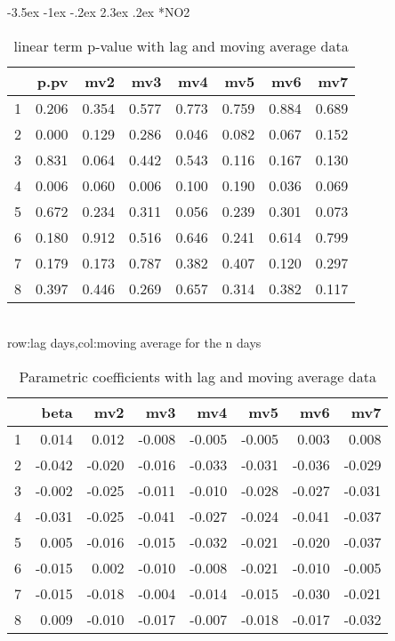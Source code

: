 \documentclass[a4paper, 12pt]{article}
\makeatletter
\def\large{\fontsize{14}{20}\selectfont}
\renewcommand\subsection{\@startsection {subsection}{1}{\z@}%
                                   {-3.5ex \@plus -1ex \@minus -.2ex}%
                                   {2.3ex \@plus.2ex}%
                                   {\centering\normalfont\large\bfseries}}
\makeatother
\begin{document}
\subsection*{NO2}
\begin{table}[h]
\centering
\caption{linear term p-value with lag and moving average data}
\begin{tabular}{rrrrrrrr}
  \hline
 & p.pv & mv2 & mv3 & mv4 & mv5 & mv6 & mv7 \\
  \hline
1 & 0.206 & 0.354 & 0.577 & 0.773 & 0.759 & 0.884 & 0.689 \\
  2 & 0.000 & 0.129 & 0.286 & 0.046 & 0.082 & 0.067 & 0.152 \\
  3 & 0.831 & 0.064 & 0.442 & 0.543 & 0.116 & 0.167 & 0.130 \\
  4 & 0.006 & 0.060 & 0.006 & 0.100 & 0.190 & 0.036 & 0.069 \\
  5 & 0.672 & 0.234 & 0.311 & 0.056 & 0.239 & 0.301 & 0.073 \\
  6 & 0.180 & 0.912 & 0.516 & 0.646 & 0.241 & 0.614 & 0.799 \\
  7 & 0.179 & 0.173 & 0.787 & 0.382 & 0.407 & 0.120 & 0.297 \\
  8 & 0.397 & 0.446 & 0.269 & 0.657 & 0.314 & 0.382 & 0.117 \\
   \hline
\end{tabular}
\\row:lag days,col:moving average for the n days
\end{table}

\begin{table}[h]
\centering
\caption{Parametric coefficients with lag and moving average data}
\begin{tabular}{rrrrrrrr}
  \hline
 & beta & mv2 & mv3 & mv4 & mv5 & mv6 & mv7 \\
  \hline
1 & 0.014 & 0.012 & -0.008 & -0.005 & -0.005 & 0.003 & 0.008 \\
  2 & -0.042 & -0.020 & -0.016 & -0.033 & -0.031 & -0.036 & -0.029 \\
  3 & -0.002 & -0.025 & -0.011 & -0.010 & -0.028 & -0.027 & -0.031 \\
  4 & -0.031 & -0.025 & -0.041 & -0.027 & -0.024 & -0.041 & -0.037 \\
  5 & 0.005 & -0.016 & -0.015 & -0.032 & -0.021 & -0.020 & -0.037 \\
  6 & -0.015 & 0.002 & -0.010 & -0.008 & -0.021 & -0.010 & -0.005 \\
  7 & -0.015 & -0.018 & -0.004 & -0.014 & -0.015 & -0.030 & -0.021 \\
  8 & 0.009 & -0.010 & -0.017 & -0.007 & -0.018 & -0.017 & -0.032 \\
   \hline
\end{tabular}
\end{table}
\end{document}
